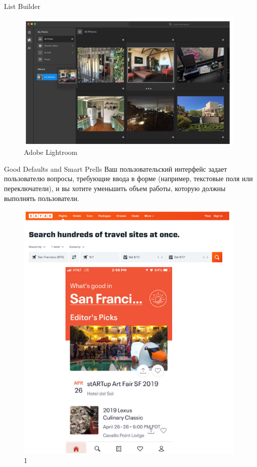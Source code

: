 \documentclass{beamer}
\begin{document}
\begin{frame}[t]{List Builder}
	\begin{figure}[h]
		\centering
		\includegraphics[scale=0.6]{images/lec08-pic59.png}
		\caption{Adobe Lightroom}
	\end{figure}
\end{frame}

\begin{frame}[t]{Good Defaults and Smart Prells}
	Ваш пользовательский интерфейс задает пользователю вопросы, требующие ввода в форме (например, текстовые поля или переключатели), и вы хотите уменьшить объем работы, которую должны выполнять пользователи.
	\begin{figure}[h]
		\centering
		\includegraphics[scale=0.4]{images/lec08-pic60.png}
		\caption{1}
	\end{figure}
\end{frame}
\end{document}
